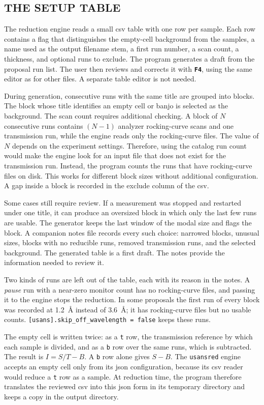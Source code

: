 \documentclass[tm]{ornltm}
\newcommand{\key}[1]{\textbf{\texttt{#1}}}
\begin{document}
\subsection{THE SETUP TABLE}

The reduction engine reads a small \ac{csv} table with one row per sample. Each
row contains a flag that distinguishes the empty-cell background from the
samples, a name used as the output filename stem, a first run number, a scan
count, a thickness, and optional runs to exclude. The program generates a draft
from the proposal run list. The user then reviews and corrects it with \key{F4},
using the same editor as for other files. A separate table editor is not needed.

During generation, consecutive runs with the same title are grouped into blocks.
The block whose title identifies an empty cell or banjo is selected as the
background. The scan count requires additional checking. A block of $N$
consecutive runs contains $(N-1)$ analyzer rocking-curve scans and one
transmission run, while the engine reads only the rocking-curve files. The value
of $N$ depends on the experiment settings. Therefore, using the catalog run
count would make the engine look for an input file that does not exist for the
transmission run. Instead, the program counts the runs that have rocking-curve
files on disk. This works for different block sizes without additional
configuration. A gap inside a block is recorded in the exclude column of the
\ac{csv}.

Some cases still require review. If a measurement was stopped and restarted
under one title, it can produce an oversized block in which only the last few
runs are usable. The generator keeps the last window of the modal size and flags
the block. A companion notes file records every such choice: narrowed blocks,
unusual sizes, blocks with no reducible runs, removed transmission runs, and the
selected background. The generated table is a first draft. The notes provide
the information needed to review it.

Two kinds of runs are left out of the table, each with its reason in the notes.
A \emph{pause} run with a near-zero monitor count has no rocking-curve files,
and passing it to the engine stops the reduction. In some proposals the first
run of every block was recorded at 1.2~\AA{} instead of 3.6~\AA{}; it has
rocking-curve files but no usable counts.
\texttt{[usans].skip\_off\_wavelength = false} keeps these runs.

The empty cell is written twice: as a \texttt{t} row, the transmission
reference by which each sample is divided, and as a \texttt{b} row over the same
runs, which is subtracted. The result is $I = S/T - B$. A \texttt{b} row alone
gives $S - B$. The \texttt{usansred} engine accepts an empty cell only from its
\ac{json} configuration, because its \ac{csv} reader would reduce a \texttt{t}
row as a sample. At reduction time, the program therefore translates the
reviewed \ac{csv} into this \ac{json} form in its temporary directory and keeps
a copy in the output directory.
\end{document}
